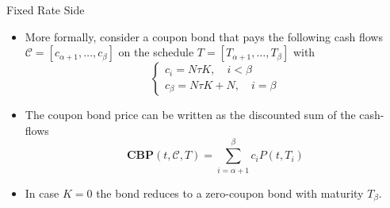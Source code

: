 \documentclass{beamer}
\begin{document}
\begin{frame}{Fixed Rate Side}
	\begin{itemize}
		\item<1-> More formally, consider a coupon bond that pays the following cash flows $\mathcal{C}=[c_{\alpha+1},\ldots,c_\beta]$	on the schedule $T = [T_{\alpha+1},\ldots,T_\beta]$ with 
		\begin{equation*}
			\begin{cases}
				c_i = N\tau K,\quad i<\beta \\
				c_\beta=N\tau K+N, \quad i=\beta	
			\end{cases}		
		\end{equation*}
		\item<2-> The coupon bond price can be written as the discounted sum of the cash-flows
		\begin{equation}
			\textbf{CBP}(t,\mathcal{C},T)=\sum_{i=\alpha+1}^{\beta}c_i P(t,T_i)
		\end{equation}
		\item<2-> In case $K=0$ the bond reduces to a zero-coupon bond with maturity $T_\beta$.
		
	\end{itemize}
\end{frame}

\end{document}
